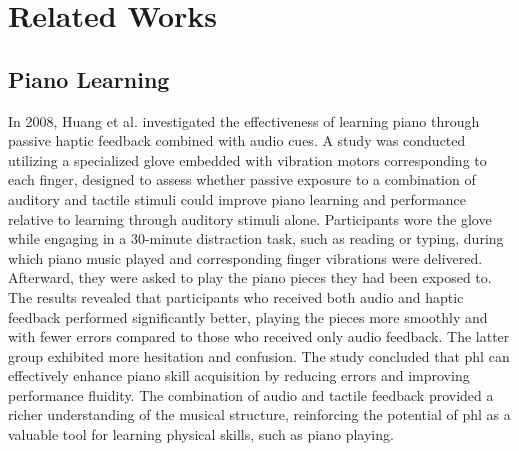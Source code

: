 \section{Related Works}
\subsection{Piano Learning}
In 2008, Huang et al. \cite{Huang2008} investigated the effectiveness of learning piano through passive haptic feedback combined with audio cues. A study was conducted utilizing a specialized glove embedded with vibration motors corresponding to each finger, designed to assess whether passive exposure to a combination of auditory and tactile stimuli could improve piano learning and performance relative to learning through auditory stimuli alone. Participants wore the glove while engaging in a 30-minute distraction task, such as reading or typing, during which piano music played and corresponding finger vibrations were delivered. Afterward, they were asked to play the piano pieces they had been exposed to. The results revealed that participants who received both audio and haptic feedback performed significantly better, playing the pieces more smoothly and with fewer errors compared to those who received only audio feedback. The latter group exhibited more hesitation and confusion. The study concluded that \gls{phl} can effectively enhance piano skill acquisition by reducing errors and improving performance fluidity. The combination of audio and tactile feedback provided a richer understanding of the musical structure, reinforcing the potential of \gls{phl} as a valuable tool for learning physical skills, such as piano playing.

